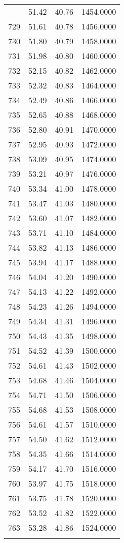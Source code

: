 \documentclass[
  captions=tableheading,
]{scrartcl}
\begin{document}
\begin{longtable} {l|l|l|l}
{728	& 51.42	& 40.76	& 1454.0000\\
729	& 51.61	& 40.78	& 1456.0000\\
730	& 51.80	& 40.79	& 1458.0000\\
731	& 51.98	& 40.80	& 1460.0000\\
732	& 52.15	& 40.82	& 1462.0000\\
733	& 52.32	& 40.83	& 1464.0000\\
734	& 52.49	& 40.86	& 1466.0000\\
735	& 52.65	& 40.88	& 1468.0000\\
736	& 52.80	& 40.91	& 1470.0000\\
737	& 52.95	& 40.93	& 1472.0000\\
738	& 53.09	& 40.95	& 1474.0000\\
739	 & 53.21 & 40.97 & 1476.0000\\
740	& 53.34	& 41.00	& 1478.0000\\
741	& 53.47	& 41.03	& 1480.0000\\
742	& 53.60	& 41.07	& 1482.0000\\
743	& 53.71	& 41.10	& 1484.0000\\
744	& 53.82	& 41.13	& 1486.0000\\
745	& 53.94	& 41.17	& 1488.0000\\
746	& 54.04	& 41.20	& 1490.0000\\
747	& 54.13	& 41.22	& 1492.0000\\
748	& 54.23	& 41.26	& 1494.0000\\
749	& 54.34	& 41.31	& 1496.0000\\
750	& 54.43	& 41.35	& 1498.0000\\
751	& 54.52	& 41.39	& 1500.0000\\
752	& 54.61	& 41.43	& 1502.0000\\
753	& 54.68	& 41.46	& 1504.0000\\
754	& 54.71	& 41.50	& 1506.0000\\
755	& 54.68	& 41.53	& 1508.0000\\
756	& 54.61	& 41.57	& 1510.0000\\
757	& 54.50	& 41.62	& 1512.0000\\
758	& 54.35	& 41.66	& 1514.0000\\
759	& 54.17	& 41.70	& 1516.0000\\
760	& 53.97	& 41.75	& 1518.0000\\
761	& 53.75	& 41.78	& 1520.0000\\
762	& 53.52	& 41.82	& 1522.0000\\
763	& 53.28	& 41.86	& 1524.0000\\
}
\end{longtable}
\end{document}

